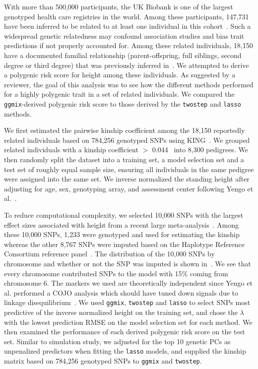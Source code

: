 \documentclass[10pt,letterpaper]{article}
\newcommand{\ggmix}{\texttt{ggmix}}
\begin{document}
With more than 500,000 participants, the UK Biobank is one of the largest genotyped health care registries in the world. Among these participants, 147,731 have been inferred to be related to at least one individual in this cohort~\cite{bycroft2018uk}. Such a widespread genetic relatedness may confound association studies and bias trait predictions if not properly accounted for. Among these related individuals, 18,150 have a documented familial relationship (parent-offspring, full siblings, second degree or third degree) that was previously inferred in~\cite{biobank2015genotyping}. We attempted to derive a polygenic risk score for height among these individuals. As suggested by a reviewer, the goal of this analysis was to see how the different methods performed for a highly polygenic trait in a set of related individuals. We compared the \ggmix-derived polygenic risk score to those derived by the \texttt{twostep} and \texttt{lasso} methods.

We first estimated the pairwise kinship coefficient among the 18,150 reportedly related individuals based on 784,256 genotyped SNPs using KING~\cite{manichaikul2010robust}. We grouped related individuals with a kinship coefficient $>$ 0.044~\cite{manichaikul2010robust} into 8,300 pedigrees. We then randomly split the dataset into a training set, a model selection set and a test set of roughly equal sample size, ensuring all individuals in the same pedigree were assigned into the same set. We inverse normalized the standing height after adjusting for age, sex, genotyping array, and assessment center following Yengo et al.~\cite{yengo2018meta}. 

To reduce computational complexity, we selected 10,000 SNPs with the largest effect sizes associated with height from a recent large meta-analysis~\cite{yengo2018meta}. Among these 10,000 SNPs, 1,233 were genotyped and used for estimating the kinship whereas the other 8,767 SNPs were imputed based on the Haplotype Reference Consortium reference panel~\cite{mccarthy2016reference}. The distribution of the 10,000 SNPs by chromosome and whether or not the SNP was imputed is shown in~. We see that every chromosome contributed SNPs to the model with 15\% coming from chromosome 6. The markers we used are theoretically independent since Yengo et al. performed a COJO analysis which should have tuned down signals due to linkage disequilibrium~\cite{yengo2018meta}. We used \ggmix, \texttt{twostep} and \texttt{lasso} to select SNPs most predictive of the inverse normalized height on the training set, and chose the $\lambda$ with the lowest prediction RMSE on the model selection set for each method. We then examined the performance of each derived polygenic risk score on the test set. Similar to simulation study, we adjusted for the top 10 genetic PCs as unpenalized predictors when fitting the \texttt{lasso} models, and supplied the kinship matrix based on 784,256 genotyped SNPs to \texttt{ggmix} and \texttt{twostep}.
\end{document}
